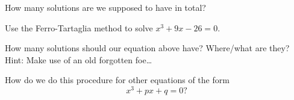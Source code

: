 \documentclass{ximera}
\begin{document}
\begin{question} How many solutions are we supposed to have in total?
\end{question}

\begin{question}
Use the Ferro-Tartaglia method to solve $x^3 + 9x -26 =0$.
\end{question}


\begin{question}
How many solutions should our equation above have? Where/what are they?
Hint: Make use of an old forgotten foe\dots
\end{question}




\begin{question} How do we do this procedure for other equations of the form
\[
x^3 + px + q = 0?
\]
\end{question}
\end{document}
